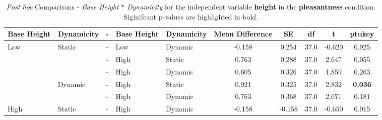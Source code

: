 \begin{table*}[ht]
    \centering
    \caption{\textit{Post hoc} Comparisons - \textit{Base Height} $\ast$ \textit{Dynamicity} for the independent variable \textbf{height} in the \textbf{pleasantness} condition. Siginifcant p-values are highlighted in bold.}
    \begin{tabular}{lllll|ccccc}
    \toprule
    \textbf{Base Height} & \textbf{Dynamicity} & -  & \textbf{Base Height} & \textbf{Dynamicity} & \textbf{Mean Difference} & \textbf{SE} & \textbf{df} & \textbf{t} & \textbf{ptukey} \\
    \midrule
    Low                  & Static              & - & Low                   & Dynamic             & -0.158                   & 0.254       & 37.0        & -0.620     & 0.925           \\
                         &                     & - & High                  & Static              & 0.763                    & 0.288       & 37.0        & 2.647      & 0.055           \\
                         &                     & - & High                  & Dynamic             & 0.605                    & 0.326       & 37.0        & 1.859      & 0.263           \\
                         & Dynamic             & - & High                  & Static              & 0.921                    & 0.325       & 37.0        & 2.832      & \textbf{0.036}  \\
                         &                     & - & High                  & Dynamic             & 0.763                    & 0.368       & 37.0        & 2.071      & 0.181           \\
    High                 & Static              & - & High                  & Dynamic             & -0.158                   & -0.158      & 37.0        & -0.650     & 0.915           \\
    \bottomrule                           
    \end{tabular}
\end{table*}


\clearpage
\onecolumn

